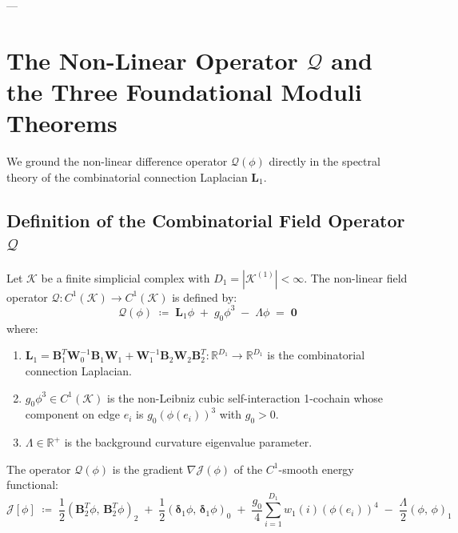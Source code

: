 \documentclass[
    12pt,
    a4paper,
    headings=normal,
    twoside=false,
    open=any,
    parskip=half
]{scrbook}
\begin{document}
---

\section{The Non-Linear Operator $\mathcal{Q}$ and the Three Foundational Moduli Theorems}
\label{sec:ch1_three_theorems}

We ground the non-linear difference operator $\mathcal{Q}(\phi)$ directly in the spectral theory of the combinatorial connection Laplacian $\mathbf{L}_1$.

\subsection{Definition of the Combinatorial Field Operator $\mathcal{Q}$}

\begin{physdefinition}\label{def:ch1_metronic_field_operator}
Let $\mathcal{K}$ be a finite simplicial complex with $D_1 = |\mathcal{K}^{(1)}| < \infty$. The non-linear field operator $\mathcal{Q} \colon C^1(\mathcal{K}) \to C^1(\mathcal{K})$ is defined by:
\begin{equation}
\boxed{\mathcal{Q}(\phi) \;\coloneqq\; \mathbf{L}_1 \phi \;+\; g_0 \phi^3 \;-\; \Lambda \phi \;=\; \mathbf{0}}
\label{eq:ch1_operator_Q_definition}
\end{equation}
where:
\begin{enumerate}[label=(\alph*), noitemsep]
    \item $\mathbf{L}_1 = \mathbf{B}_1^T \mathbf{W}_0^{-1} \mathbf{B}_1 \mathbf{W}_1 + \mathbf{W}_1^{-1} \mathbf{B}_2 \mathbf{W}_2 \mathbf{B}_2^T \colon \mathbb{R}^{D_1} \to \mathbb{R}^{D_1}$ is the combinatorial connection Laplacian.
    \item $g_0 \phi^3 \in C^1(\mathcal{K})$ is the non-Leibniz cubic self-interaction 1-cochain whose component on edge $e_i$ is $g_0 (\phi(e_i))^3$ with $g_0 > 0$.
    \item $\Lambda \in \mathbb{R}^+$ is the background curvature eigenvalue parameter.
\end{enumerate}
\end{physdefinition}



The operator $\mathcal{Q}(\phi)$ is the gradient $\nabla \mathcal{J}(\phi)$ of the $C^1$-smooth energy functional:
\begin{equation}
\mathcal{J}[\phi] \;\coloneqq\; \frac{1}{2} (\mathbf{B}_2^T \phi, \, \mathbf{B}_2^T \phi)_2 \;+\; \frac{1}{2} (\boldsymbol{\delta}_1 \phi, \, \boldsymbol{\delta}_1 \phi)_0 \;+\; \frac{g_0}{4} \sum_{i=1}^{D_1} w_1(i) (\phi(e_i))^4 \;-\; \frac{\Lambda}{2} (\phi, \, \phi)_1
\label{eq:ch1_energy_functional_J}
\end{equation}
\end{document}
